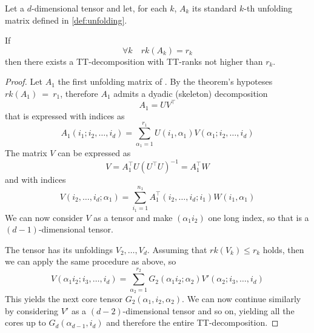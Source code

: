 \begin{Teo} \label{teo:ttsvd}
  Let \A a $d$-dimensional tensor and let, for each $k$, $A_k$ its standard $k$-th unfolding matrix defined in \ref{def:unfolding}.

  If
  \begin{equation*}
    \forall k \quad rk(A_k) = r_k
  \end{equation*}
  then there exists a TT-decomposition with TT-ranks not higher than $r_k$.

  \begin{proof}
    Let 
    $A_1$ the first unfolding matrix of \A. By the theorem's hypoteses $rk(A_1)~=~r_1$, therefore $A_1$ admits a dyadic (skeleton) decomposition%
    \begin{equation*}
      A_1 = UV^\top
    \end{equation*}
    that is expressed with indices as
    \begin{equation*}
      A_1(i_1;i_2,\ldots,i_d) = \sum_{\alpha_1 = 1}^{r_1} U(i_1,\alpha_1) V(\alpha_1;i_2,\ldots,i_d)
    \end{equation*}
    The matrix $V$ can be expressed as
    \begin{equation}\label{eq:Vdecomp}
      V = A_1^\top U (U^\top U)^{-1} = A_1^\top W
    \end{equation}
    and with indices
    \begin{equation*}
      V(i_2,\ldots,i_d;\alpha_1) = \sum_{i_1 = 1}^{n_1} A_1^\top(i_2,\ldots,i_d;i_1) W(i_1,\alpha_1)
    \end{equation*}
    We can now consider $V$ as a tensor and make $(\alpha_1 i_2)$ one long index, so that \V is a $(d-1)$-dimensional tensor.

    The tensor \V has its unfoldings $V_2,\ldots,V_d$. Assuming that $rk(V_k) \leq r_k$ holds, then we can apply the same procedure as above, so
    \begin{equation*}
      V(\alpha_1 i_2;i_3,\ldots,i_d) = \sum_{\alpha_2=1}^{r_2} G_2(\alpha_1 i_2;\alpha_2) V'(\alpha_2;i_3,\ldots,i_d)
    \end{equation*}
    This yields the next core tensor $G_2(\alpha_1,i_2,\alpha_2)$.
    We can now continue similarly by considering $V'$ as a $(d-2)$-dimensional tensor and so on, yielding all the cores up to $G_d(\alpha_{d-1},i_d)$ and therefore the entire TT-decomposition.%


\end{proof}
\end{Teo}
